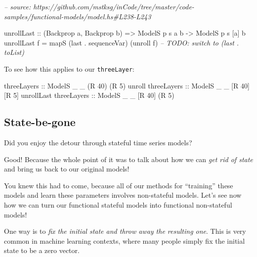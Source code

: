 \documentclass[]{article}
\newenvironment{Shaded}{}{}
\newcommand{\CommentTok}[1]{\textcolor[rgb]{0.38,0.63,0.69}{\textit{#1}}}
\newcommand{\DataTypeTok}[1]{\textcolor[rgb]{0.56,0.13,0.00}{#1}}
\newcommand{\DecValTok}[1]{\textcolor[rgb]{0.25,0.63,0.44}{#1}}
\newcommand{\FunctionTok}[1]{\textcolor[rgb]{0.02,0.16,0.49}{#1}}
\newcommand{\NormalTok}[1]{#1}
\newcommand{\OtherTok}[1]{\textcolor[rgb]{0.00,0.44,0.13}{#1}}
\begin{document}
\begin{Shaded}
\begin{Highlighting}[]
\CommentTok{-- source: https://github.com/mstksg/inCode/tree/master/code-samples/functional-models/model.hs#L238-L243}

\NormalTok{unrollLast}
\OtherTok{    ::}\NormalTok{ (}\DataTypeTok{Backprop}\NormalTok{ a, }\DataTypeTok{Backprop}\NormalTok{ b)}
    \OtherTok{=>} \DataTypeTok{ModelS}\NormalTok{ p s  a  b}
    \OtherTok{->} \DataTypeTok{ModelS}\NormalTok{ p s [a] b}
\NormalTok{unrollLast f }\FunctionTok{=}\NormalTok{ mapS (last }\FunctionTok{.}\NormalTok{ sequenceVar) (unroll f)}
\CommentTok{-- TODO: switch to (last . toList)}
\end{Highlighting}
\end{Shaded}

To see how this applies to our \texttt{threeLayer}:

\begin{Shaded}
\begin{Highlighting}[]
\OtherTok{threeLayers            ::} \DataTypeTok{ModelS}\NormalTok{ _ _ (}\DataTypeTok{R} \DecValTok{40}\NormalTok{) (}\DataTypeTok{R} \DecValTok{5}\NormalTok{)}
\NormalTok{unroll}\OtherTok{ threeLayers     ::} \DataTypeTok{ModelS}\NormalTok{ _ _ [}\DataTypeTok{R} \DecValTok{40}\NormalTok{] [}\DataTypeTok{R} \DecValTok{5}\NormalTok{]}
\NormalTok{unrollLast}\OtherTok{ threeLayers ::} \DataTypeTok{ModelS}\NormalTok{ _ _ [}\DataTypeTok{R} \DecValTok{40}\NormalTok{] (}\DataTypeTok{R} \DecValTok{5}\NormalTok{)}
\end{Highlighting}
\end{Shaded}

\hypertarget{state-be-gone}{%
\subsection{State-be-gone}\label{state-be-gone}}

Did you enjoy the detour through stateful time series models?

Good! Because the whole point of it was to talk about how we can \emph{get rid
of state} and bring us back to our original models!

You knew this had to come, because all of our methods for ``training'' these
models and learn these parameters involves non-stateful models. Let's see now
how we can turn our functional stateful models into functional non-stateful
models!

One way is to \emph{fix the initial state and throw away the resulting one}.
This is very common in machine learning contexts, where many people simply fix
the initial state to be a zero vector.
\end{document}

